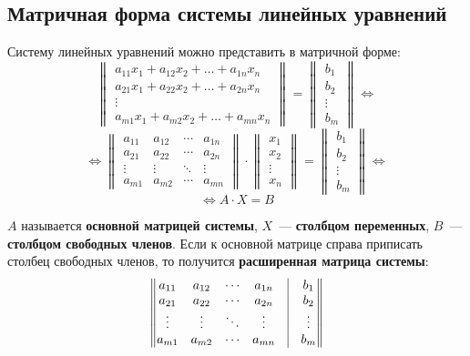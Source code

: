 \subsection{Матричная форма системы линейных уравнений}
Систему линейных уравнений можно представить в матричной форме:
\begin{equation*}
\begin{Vmatrix}
a_{11}x_1 + a_{12}x_2 + \dots + a_{1n}x_n \\
a_{21}x_1 + a_{22}x_2 + \dots + a_{2n}x_n \\
\vdots \\
a_{m1}x_1 + a_{m2}x_2 + \dots + a_{mn}x_n
\end{Vmatrix} =
\begin{Vmatrix}
b_1 \\
b_2 \\
\vdots \\
b_m
\end{Vmatrix}
\Leftrightarrow
\end{equation*}
\begin{equation*}
\Leftrightarrow
\begin{Vmatrix}
a_{11} & a_{12} & \cdots & a_{1n} \\
a_{21} & a_{22} & \cdots & a_{2n} \\
\vdots & \vdots & \ddots & \vdots \\
a_{m1} & a_{m2} & \cdots & a_{mn}
\end{Vmatrix} \cdot
\begin{Vmatrix}
x_1 \\
x_2 \\
\vdots \\
x_n
\end{Vmatrix} =
\begin{Vmatrix}
b_1 \\
b_2 \\
\vdots \\
b_m
\end{Vmatrix}
\Leftrightarrow
\end{equation*}
\begin{equation*}
\Leftrightarrow
A \cdot X = B
\end{equation*}

$A$ называется \textbf{основной матрицей системы}, $X$~--- \textbf{столбцом переменных}, $B$~--- \textbf{столбцом свободных членов}.
Если к основной матрице справа приписать столбец свободных членов, то получится \textbf{расширенная матрица системы}:
\begin{equation*}
\begin{Vmatrix}
a_{11} & a_{12} & \cdots & a_{1n} & \vline & b_1 \\
a_{21} & a_{22} & \cdots & a_{2n} & \vline & b_2 \\
\vdots & \vdots & \ddots & \vdots & \vline & \vdots \\
a_{m1} & a_{m2} & \cdots & a_{mn} & \vline & b_m
\end{Vmatrix}
\end{equation*}